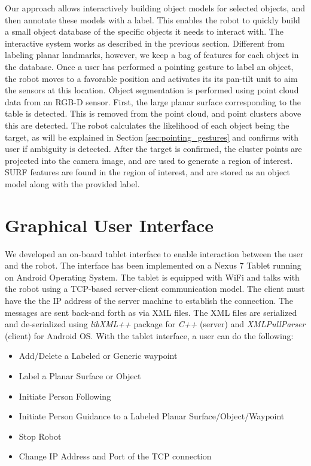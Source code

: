 Our approach allows interactively building object models for selected objects, and then annotate these models with a label. This enables the robot to quickly build a small object database of the specific objects it needs to interact with. The interactive system works as described in the previous section. Different from labeling planar landmarks, however, we keep a bag of features for each object in the database. Once a user has performed a pointing gesture to label an object, the robot moves to a favorable position and activates its its pan-tilt unit to aim the sensors at this location. Object segmentation is performed using point cloud data from an RGB-D sensor. First, the large planar surface corresponding to the table is detected. This is removed from the point cloud, and point clusters above this are detected. The robot calculates the likelihood of each object being the target, as will be explained in Section \ref{sec:pointing_gestures} and confirms with user if ambiguity is detected. After the target is confirmed, the cluster points are projected into the camera image, and are used to generate a region of interest. SURF features are found in the region of interest, and are stored as an object model along with the provided label.

\section{Graphical User Interface}
\label{sec:map_ui}

We developed an on-board tablet interface to enable interaction between the user and the robot. The interface has been implemented on a Nexus 7 Tablet running on Android Operating System. The tablet is equipped with WiFi and talks with the robot using a TCP-based server-client communication model. The client must have the the IP address of the server machine to establish the connection. The messages are sent back-and forth as via XML files. The XML files are serialized and de-serialized using \textit{libXML++} package for \textit{C++} (server) and \textit{XMLPullParser} (client) for Android OS. With the tablet interface, a user can do the following:

\begin{itemize}
\item Add/Delete a Labeled or Generic waypoint
\item Label a Planar Surface or Object
\item Initiate Person Following
\item Initiate Person Guidance to a Labeled Planar Surface/Object/Waypoint
\item Stop Robot
\item Change IP Address and Port of the TCP connection
\end{itemize}


